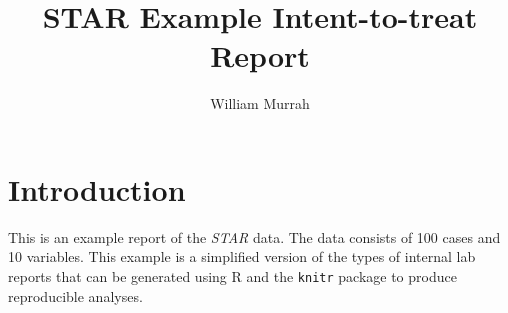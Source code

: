\documentclass{article}\usepackage[]{graphicx}\usepackage[]{color}
\begin{document}
\author{William Murrah}
\title{STAR Example Intent-to-treat Report}
\maketitle
\tableofcontents







\clearpage
\section{Introduction}

This is an example report of the \emph{STAR} data. The data consists of 100 cases and 10 variables. This example is a simplified version of the types of internal lab reports that can be generated using R and the \texttt{knitr} package to produce reproducible analyses. 
\end{document}
